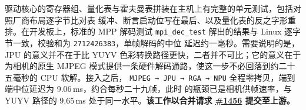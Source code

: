 驱动核心的寄存器组、量化表与霍夫曼表拼装在主机上有完整的单元测试，包括对照厂商布局逐字节比对表
缓冲、断言启动位写在最后、以及量化表的反之字形重排。在开发板上，标准的 MPP 解码测试
\texttt{mpi\_dec\_test} 解出的结果与 Linux 逐字节一致，校验和为 \texttt{2712426383}，单帧解码的中位
延迟约一毫秒。需要说明的是，JPU 的意义并不在于比 YUYV 色彩转换路径更快，二者并不可比；它的意义在于
为相机的原生 MJPEG 模式提供一条硬件解码通路，使这一步不必回落到约二十五毫秒的 CPU 软解。接入之后，
\texttt{MJPEG\,→\,JPU\,→\,RGA\,→\,NPU} 全程零拷贝，端到端中位延迟为 9.06\,ms，约合每秒二十九帧，此时
的瓶颈已是相机供帧速率，与 YUYV 路径的 9.65\,ms 处于同一水平。\textbf{该工作以合并请求 \href{https://github.com/rcore-os/tgoskits/pull/1456}{\#1456} 提交至上游。}
